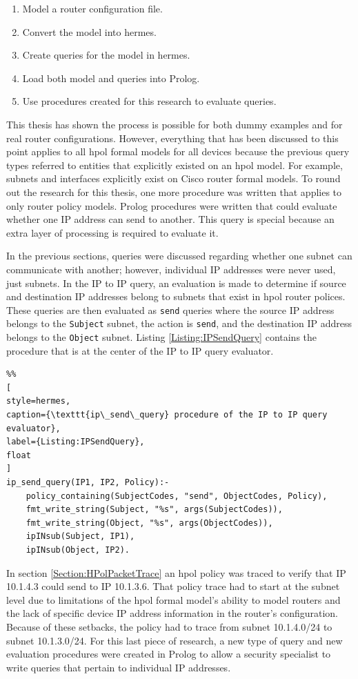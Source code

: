 \documentclass[12pt,letterpaper]{report}
\begin{document}
\begin{enumerate}
	\item Model a router configuration file.
	\item Convert the model into \ac{hermes}.
	\item Create queries for the model in \ac{hermes}.
	\item Load both model and queries into Prolog.
	\item Use procedures created for this research to evaluate queries.
\end{enumerate}

This thesis has shown the process is possible for both dummy examples and for real router configurations. However, everything that has been discussed to this point applies to all \ac{hpol} formal models for all devices because the previous query types referred to entities that explicitly existed on an \ac{hpol} model. For example, subnets and interfaces explicitly exist on Cisco router formal models. To round out the research for this thesis, one more procedure was written that applies to only router policy models. Prolog procedures were written that could evaluate whether one IP address can send to another. This query is special because an extra layer of processing is required to evaluate it. 

In the previous sections, queries were discussed regarding whether one subnet can communicate with another; however, individual IP addresses were never used, just subnets. In the IP to IP query, an evaluation is made to determine if source and destination IP addresses belong to subnets that exist in \ac{hpol} router polices. These queries are then evaluated as \texttt{send} queries where the source IP address belongs to the \texttt{Subject} subnet, the action is \texttt{send}, and the destination IP address belongs to the \texttt{Object} subnet. Listing \ref{Listing:IPSendQuery} contains the procedure that is at the center of the IP to IP query evaluator.

\begin{lstlisting}%%
[
style=hermes,
caption={\texttt{ip\_send\_query} procedure of the IP to IP query evaluator},
label={Listing:IPSendQuery},
float
]
ip_send_query(IP1, IP2, Policy):-
	policy_containing(SubjectCodes, "send", ObjectCodes, Policy),
	fmt_write_string(Subject, "%s", args(SubjectCodes)),
	fmt_write_string(Object, "%s", args(ObjectCodes)),
	ipINsub(Subject, IP1),
	ipINsub(Object, IP2).
\end{lstlisting}

In section \ref{Section:HPolPacketTrace} an \ac{hpol} policy was traced to verify that IP 10.1.4.3 could send to IP 10.1.3.6. That policy trace had to start at the subnet level due to limitations of the \ac{hpol} formal model's ability to model routers and the lack of specific device IP address information in the router's configuration. Because of these setbacks, the policy had to trace from subnet 10.1.4.0/24 to subnet 10.1.3.0/24. For this last piece of research, a new type of query and new evaluation procedures were created in Prolog to allow a security specialist to write queries that pertain to individual IP addresses. 
\end{document}
